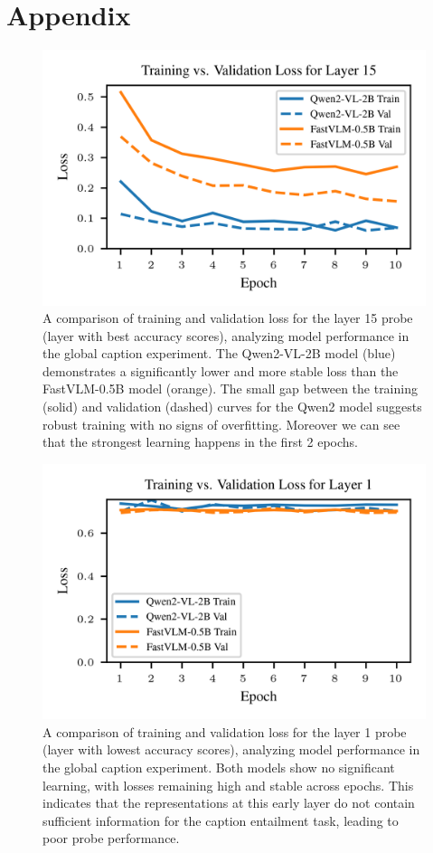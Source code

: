 \documentclass[11pt]{article}
\begin{document}
\section{Appendix}
\begin{figure}[H]
    \centering
    \includegraphics[width=1\linewidth]{figures/global/_combined_exp1/combined_training_progress_layer_15.png}
    \caption{A comparison of training and validation loss for the layer 15 probe (layer with best accuracy scores), analyzing model performance in the global caption experiment. The Qwen2-VL-2B model (blue) demonstrates a significantly lower and more stable loss than the FastVLM-0.5B model (orange). The small gap between the training (solid) and validation (dashed) curves for the Qwen2 model suggests robust training with no signs of overfitting. Moreover we can see that the strongest learning happens in the first 2 epochs.}
\end{figure}

\begin{figure}[H]
    \centering
    \includegraphics[width=1\linewidth]{figures/global/_combined_exp1/combined_training_progress_layer_1.png}
    \caption{A comparison of training and validation loss for the layer 1 probe (layer with lowest accuracy scores), analyzing model performance in the global caption experiment. Both models show no significant learning, with losses remaining high and stable across epochs. This indicates that the representations at this early layer do not contain sufficient information for the caption entailment task, leading to poor probe performance.}
\end{figure}
\end{document}
